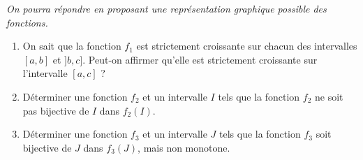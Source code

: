 
\begin{exercice}\label{exoanalyseCTU-0022}

\emph{On pourra répondre en proposant une représentation graphique possible des fonctions.}
\begin{enumerate}
\item On sait que la fonction $f_{1}$ est strictement croissante sur chacun des intervalles $[a,b]$ et $]b,c]$. Peut-on affirmer qu'elle est strictement croissante sur l'intervalle  $[a,c]$ ?
\item Déterminer une fonction $f_{2}$ et un intervalle $I$ tels que la fonction $f_{2}$ ne soit pas bijective de $I$ dans $f_{2}(I)$.  
\item Déterminer une fonction $f_{3}$ et un intervalle $J$ tels que la fonction $f_{3}$  soit  bijective de $J$ dans $f_{3}(J)$, mais non monotone.  
\end{enumerate}


\end{exercice}
